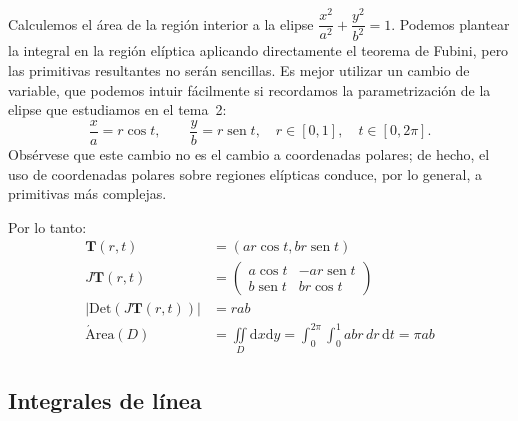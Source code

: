 \begin{ejemplo}
Calculemos el área de la región interior a la elipse $\dfrac{x^2}{a^2}+\dfrac{y^2}{b^2}=1$.
Podemos plantear la integral en la región elíptica aplicando directamente el teorema de Fubini, pero las primitivas resultantes no serán sencillas.
Es mejor utilizar un cambio de variable, que podemos intuir fácilmente si recordamos la parametrización de la elipse que estudiamos en el tema~2:
\[
\frac{x}a =r \cos t,\qquad \frac{y}b=r\operatorname{sen} t,\quad r\in[0,1],\quad t\in[0,2\pi].
\]
Obsérvese que este cambio no es el cambio a coordenadas polares; de hecho, el uso de coordenadas polares sobre regiones elípticas conduce, por lo general, a primitivas más complejas.

Por lo tanto:
\begin{align*}
\boldsymbol{T}(r,t) &= (ar\cos t,br\operatorname{sen} t) \\
J\boldsymbol{T}(r,t) &=
\begin{pmatrix}
a\cos t & -ar\operatorname{sen} t \\
b\operatorname{sen} t & br\cos t
\end{pmatrix} \\
|\mathrm{Det}(J\boldsymbol{T}(r,t))| & = rab \\
\mathrm{\acute{A}rea}(\mathit D)&=\iint\limits_{\mathit D} \mathrm dx\mathrm dy=\int_0^{2\pi}\int_0^1 abr\,dr\,\mathrm dt =\pi ab\tag*{\fej}
\end{align*}
\end{ejemplo}


%
%

\subsection{Integrales de línea}


